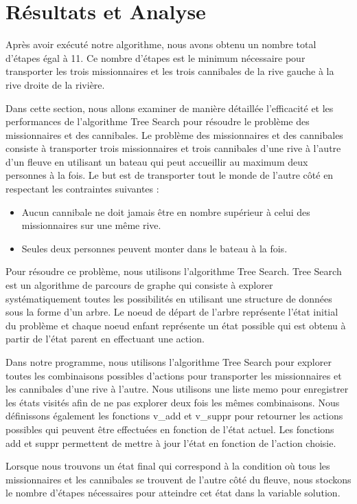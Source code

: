 \documentclass{article}
\begin{document}
\section{Résultats et Analyse}

\noindent  Après avoir exécuté notre algorithme, nous avons obtenu un nombre total d'étapes égal à 11. Ce nombre d'étapes est le minimum nécessaire pour transporter les trois missionnaires et les trois cannibales de la rive gauche à la rive droite de la rivière.

\noindent  Dans cette section, nous allons examiner de manière détaillée l'efficacité et les performances de l'algorithme Tree Search pour résoudre le problème des missionnaires et des cannibales.
Le problème des missionnaires et des cannibales consiste à transporter trois missionnaires et trois cannibales d'une rive à l'autre d'un fleuve en utilisant un bateau qui peut accueillir au maximum deux personnes à la fois. Le but est de transporter tout le monde de l'autre côté en respectant les contraintes suivantes :
\begin{itemize}
\item Aucun cannibale ne doit jamais être en nombre supérieur à celui des missionnaires sur une même rive.
\item Seules deux personnes peuvent monter dans le bateau à la fois.
\end{itemize}

\noindent Pour résoudre ce problème, nous utilisons l'algorithme Tree Search. Tree Search est un algorithme de parcours de graphe qui consiste à explorer systématiquement toutes les possibilités en utilisant une structure de données sous la forme d'un arbre. Le noeud de départ de l'arbre représente l'état initial du problème et chaque noeud enfant représente un état possible qui est obtenu à partir de l'état parent en effectuant une action.

\noindent Dans notre programme, nous utilisons l'algorithme Tree Search pour explorer toutes les combinaisons possibles d'actions pour transporter les missionnaires et les cannibales d'une rive à l'autre. Nous utilisons une liste memo pour enregistrer les états visités afin de ne pas explorer deux fois les mêmes combinaisons.
Nous définissons également les fonctions v\_add et v\_suppr pour retourner les actions possibles qui peuvent être effectuées en fonction de l'état actuel. Les fonctions add et suppr permettent de mettre à jour l'état en fonction de l'action choisie.

\noindent Lorsque nous trouvons un état final qui correspond à la condition où tous les missionnaires et les cannibales se trouvent de l'autre côté du fleuve, nous stockons le nombre d'étapes nécessaires pour atteindre cet état dans la variable solution.
\end{document}
